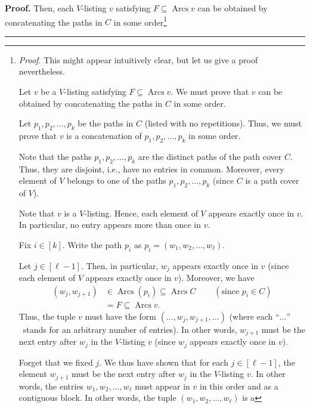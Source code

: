 \documentclass[numbers=enddot,12pt,final,onecolumn,notitlepage]{scrartcl}%
\numberwithin{exer}{section}
\theoremstyle{definition}
\newenvironment{proof}[1][Proof]{\noindent\textbf{#1.} }{\ \rule{0.5em}{0.5em}}
\newenvironment{verlong}{}{}
\begin{document}
\begin{verlong}
\begin{proof}
Then, each $V$-listing $v$ satisfying $F\subseteq\operatorname*{Arcs}v$ can be
obtained by concatenating the paths in $C$ in some
order\footnote{\textit{Proof.} This might appear intuitively clear, but let us
give a proof nevertheless.
\par
Let $v$ be a $V$-listing satisfying $F\subseteq\operatorname*{Arcs}v$. We must
prove that $v$ can be obtained by concatenating the paths in $C$ in some
order.
\par
Let $p_{1},p_{2},\ldots,p_{k}$ be the paths in $C$ (listed with no
repetitions). Thus, we must prove that $v$ is a concatenation of $p_{1}%
,p_{2},\ldots,p_{k}$ in some order.
\par
Note that the paths $p_{1},p_{2},\ldots,p_{k}$ are the distinct paths of the
path cover $C$. Thus, they are disjoint, i.e., have no entries in common.
Moreover, every element of $V$ belongs to one of the paths $p_{1},p_{2}%
,\ldots,p_{k}$ (since $C$ is a path cover of $V$).
\par
Note that $v$ is a $V$-listing. Hence, each element of $V$ appears exactly
once in $v$. In particular, no entry appears more than once in $v$.
\par
Fix $i\in\left[  k\right]  $. Write the path $p_{i}$ as $p_{i}=\left(
w_{1},w_{2},\ldots,w_{\ell}\right)  $.
\par
Let $j\in\left[  \ell-1\right]  $. Then, in particular, $w_{j}$ appears
exactly once in $v$ (since each element of $V$ appears exactly once in $v$).
Moreover, we have
\begin{align*}
\left(  w_{j},w_{j+1}\right)   &  \in\operatorname*{Arcs}\left(  p_{i}\right)
\subseteq\operatorname*{Arcs}C\ \ \ \ \ \ \ \ \ \ \left(  \text{since }%
p_{i}\in C\right) \\
&  =F\subseteq\operatorname*{Arcs}v.
\end{align*}
Thus, the tuple $v$ must have the form $\left(  \ldots,w_{j},w_{j+1}%
,\ldots\right)  $ (where each \textquotedblleft$\ldots$\textquotedblright%
\ stands for an arbitrary number of entries). In other words, $w_{j+1}$ must
be the next entry after $w_{j}$ in the $V$-listing $v$ (since $w_{j}$ appears
exactly once in $v$).
\par
Forget that we fixed $j$. We thus have shown that for each $j\in\left[
\ell-1\right]  $, the element $w_{j+1}$ must be the next entry after $w_{j}$
in the $V$-listing $v$. In other words, the entries $w_{1},w_{2}%
,\ldots,w_{\ell}$ must appear in $v$ in this order and as a contiguous block.
In other words, the tuple $\left(  w_{1},w_{2},\ldots,w_{\ell}\right)  $ is a
}
\end{proof}
\end{verlong}
\end{document}
